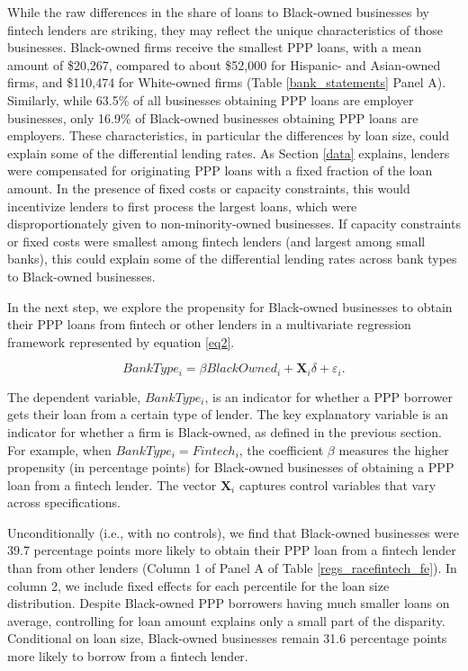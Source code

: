 \documentclass[11pt]{article}
\begin{document}
While the raw differences in the share of loans to Black-owned businesses by fintech lenders are striking, they may reflect the unique characteristics of those businesses. Black-owned firms receive the smallest PPP loans, with a mean amount of \$20,267, compared to about \$52,000 for Hispanic- and Asian-owned firms, and \$110,474 for White-owned firms (Table \ref{bank_statements} Panel A). Similarly, while 63.5\% of all businesses obtaining PPP loans are employer businesses, only 16.9\% of Black-owned businesses obtaining PPP loans are employers. These characteristics, in particular the differences by loan size, could explain some of the differential lending rates. As Section \ref{data} explains, lenders were compensated for originating PPP loans with a fixed fraction of the loan amount. In the presence of fixed costs or capacity constraints, this would incentivize lenders to first process the largest loans, which were disproportionately given to non-minority-owned businesses. If capacity constraints or fixed costs were smallest among fintech lenders (and largest among small banks), this could explain some of the differential lending rates across bank types to Black-owned businesses.

In the next step, we explore the propensity for Black-owned businesses to obtain their PPP loans from fintech or other lenders in a multivariate regression framework represented by equation \ref{eq2}.\vspace{-.2cm}

 \begin{equation}\label{eq2}
    BankType_i=\beta BlackOwned_i + \mathbf{X}_i\delta + \varepsilon_{i}.
  \end{equation}

\noindent The dependent variable, $BankType_i$, is an indicator for whether a PPP borrower gets their loan from a certain type of lender. The key explanatory variable is an indicator for whether a firm is Black-owned, as defined in the previous section. For example, when $BankType_i = Fintech_i$, the coefficient $\beta$ measures the higher propensity (in percentage points) for Black-owned businesses of obtaining a PPP loan from a fintech lender.  The vector $\mathbf{X}_i$ captures control variables that vary across specifications.

Unconditionally (i.e., with no controls), we find that Black-owned businesses were 39.7 percentage points more likely to obtain their PPP loan from a fintech lender than from other lenders (Column 1 of Panel A of Table \ref{regs_racefintech_fe}). In column 2, we include fixed effects for each percentile for the loan size distribution. Despite Black-owned PPP borrowers having much smaller loans on average, controlling for loan amount explains only a small part of the disparity. Conditional on loan size, Black-owned businesses remain 31.6 percentage points more likely to borrow from a fintech lender.
\end{document}
